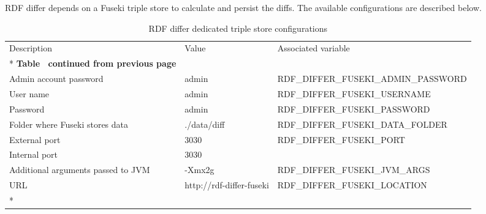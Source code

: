 RDF differ depends on a Fuseki triple store to calculate and persist the diffs. The available configurations are described below. 

\begin{longtable}[c]{@{}p{4cm}p{2cm}l@{}}
	\toprule
	Description                        & Value                    & Associated variable                  \\* \midrule
	\endfirsthead
	\multicolumn{3}{c}%
	{{\bfseries Table \thetable\ continued from previous page}}                                          \\
	\endhead
	\bottomrule
	\endfoot
	\endlastfoot
	Admin account password             & admin                    & RDF\_DIFFER\_FUSEKI\_ADMIN\_PASSWORD \\
	User name                          & admin                    & RDF\_DIFFER\_FUSEKI\_USERNAME        \\
	Password                           & admin                    & RDF\_DIFFER\_FUSEKI\_PASSWORD        \\
	Folder where Fuseki stores data    & ./data/diff              & RDF\_DIFFER\_FUSEKI\_DATA\_FOLDER    \\
	External port                      & 3030                     & RDF\_DIFFER\_FUSEKI\_PORT            \\
	Internal port                      & 3030                     &                                      \\
	Additional arguments passed to JVM & -Xmx2g                   & RDF\_DIFFER\_FUSEKI\_JVM\_ARGS       \\
	URL                                & http://rdf-differ-fuseki & RDF\_DIFFER\_FUSEKI\_LOCATION        \\* \bottomrule
	\caption{RDF differ dedicated triple store configurations}
	\label{tab:my-table2}                                                                                \\
\end{longtable}
